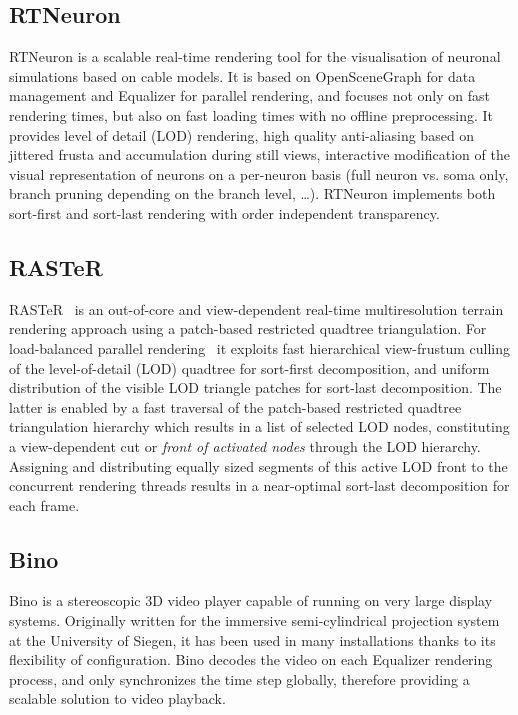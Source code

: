 \subsection{RTNeuron}

RTNeuron \cite{HBBES:13} is a scalable real-time rendering tool for the
visualisation of neuronal simulations based on cable models. It is based on
OpenSceneGraph for data management and Equalizer for parallel rendering, and
focuses not only on fast rendering times, but also on fast loading times with no
offline preprocessing. It provides level of detail (LOD) rendering, high quality
anti-aliasing based on jittered frusta and accumulation during still views,
interactive modification of the visual representation of neurons on a per-neuron
basis (full neuron vs. soma only, branch pruning depending on the branch level,
\dots). RTNeuron implements both sort-first and sort-last rendering with order
independent transparency.

\subsection{RASTeR}

RASTeR~\cite{BGP:09} is an out-of-core and view-dependent real-time
multiresolution terrain rendering approach using a patch-based restricted
quadtree triangulation. For load-balanced parallel rendering~\cite{GMBP:10} it
exploits fast hierarchical view-frustum culling of the level-of-detail (LOD)
quadtree for sort-first decomposition, and uniform distribution of the visible
LOD triangle patches for sort-last decomposition. The latter is enabled by a
fast traversal of the patch-based restricted quadtree triangulation hierarchy
which results in a list of selected LOD nodes, constituting a view-dependent cut
or \emph{front of activated nodes} through the LOD hierarchy. Assigning and
distributing equally sized segments of this active LOD front to the concurrent
rendering threads results in a near-optimal sort-last decomposition for each
frame.

\subsection{Bino}

Bino is a stereoscopic 3D video player capable of running on very large display
systems. Originally written for the immersive semi-cylindrical projection
system at the University of Siegen, it has been used in many installations
thanks to its flexibility of configuration. Bino decodes the video on each
Equalizer rendering process, and only synchronizes the time step globally,
therefore providing a scalable solution to video playback.

